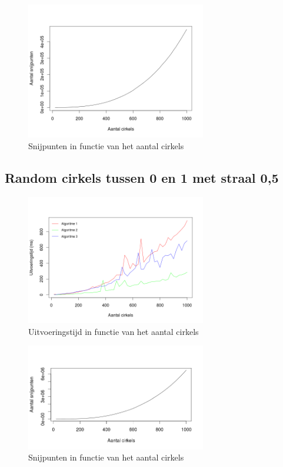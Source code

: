 \documentclass[11pt,a4paper]{article}
\begin{document}
\begin{figure}[H]
\centering
\includegraphics[width=0.7\textwidth]{snijpunten_01.png}
\caption*{Snijpunten in functie van het aantal cirkels}
\end{figure}

\subsection{Random cirkels tussen 0 en 1 met straal 0,5}
\begin{figure}[H]
\centering
\includegraphics[width=0.7\textwidth]{uitvoeringstijd_05.png}
\caption*{Uitvoeringstijd in functie van het aantal cirkels}
\end{figure}

\begin{figure}[H]
\centering
\includegraphics[width=0.7\textwidth]{snijpunten_05.png}
\caption*{Snijpunten in functie van het aantal cirkels}
\end{figure}
\end{document}
